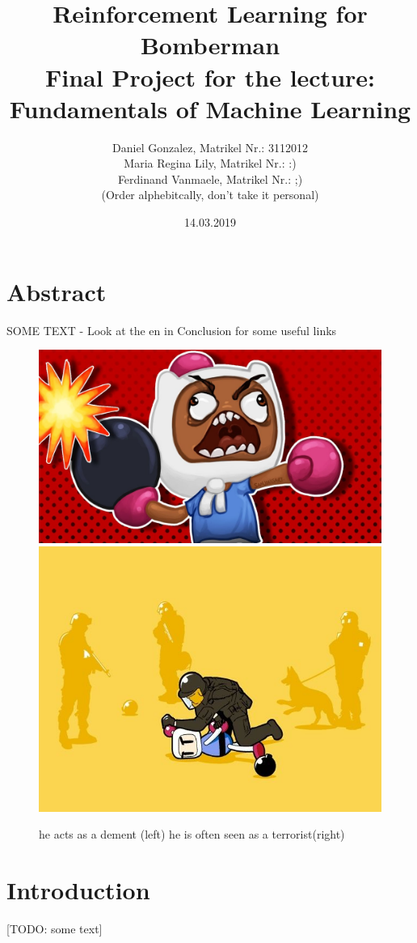 \documentclass[a4paper]{article}
\title{\textbf{Reinforcement Learning for Bomberman}
\\Final Project for the lecture:  \\Fundamentals of Machine Learning}
\author{Daniel Gonzalez, Matrikel Nr.: 3112012\\ Maria Regina Lily, Matrikel Nr.:  :)\\ Ferdinand Vanmaele, Matrikel Nr.: ;) \\ (Order alphebitcally, don't take it personal) }
\date{14.03.2019}
\begin{document}
\maketitle
\section{Abstract}
SOME TEXT - Look at the en in Conclusion for some useful links


\begin{figure}[h]
\includegraphics[scale=0.202]{images/img1}
\includegraphics[scale=0.3]{images/img2}
\caption{he acts as a dement (left) he is often seen as a terrorist(right)}
\end{figure}
\section{Introduction}
[TODO: some text]
\end{document}
